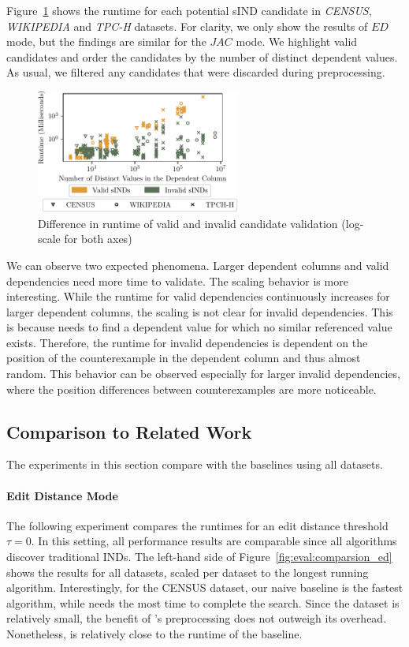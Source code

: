 Figure~\ref{fig:eval:valid_dependencies} shows the runtime for each potential sIND candidate in \emph{CENSUS}, \emph{WIKIPEDIA} and \emph{TPC-H} datasets.
For clarity, we only show the results of $ED$ mode, but the findings are similar for the $JAC$ mode.
We highlight valid candidates and order the candidates by the number of distinct dependent values.
As usual, we filtered any candidates that were discarded during preprocessing.
\begin{figure}[ht]
    \centering
    \includegraphics[width=0.6\textwidth]{figures/valid_sIND_impact.pdf}
    \caption{Difference in runtime of valid and invalid candidate validation (log-scale for both axes)}
    \label{fig:eval:valid_dependencies}
\end{figure}

We can observe two expected phenomena.
Larger dependent columns and valid dependencies need more time to validate.
The scaling behavior is more interesting.
While the runtime for valid dependencies continuously increases for larger dependent columns, the scaling is not clear for invalid dependencies.
This is because \sawfish needs to find a dependent value for which no similar referenced value exists.
Therefore, the runtime for invalid dependencies is dependent on the position of the counterexample in the dependent column and thus almost random.
This behavior can be observed especially for larger invalid dependencies, where the position differences between counterexamples are more noticeable.

\subsection{Comparison to Related Work}

The experiments in this section compare \sawfish with the baselines using all datasets.

\paragraph{Edit Distance Mode}
The following experiment compares the runtimes for an edit distance threshold $\tau = 0$. In this setting, all performance results are comparable since all algorithms discover traditional INDs.
The left-hand side of Figure~\ref{fig:eval:comparsion_ed} shows the results for all datasets, scaled per dataset to the longest running algorithm.
Interestingly, for the CENSUS dataset, our naive baseline is the fastest algorithm, while  needs the most time to complete the search.
Since the dataset is relatively small, the benefit of \sawfish's preprocessing does not outweigh its overhead.
Nonetheless, \sawfish is relatively close to the runtime of the baseline.

